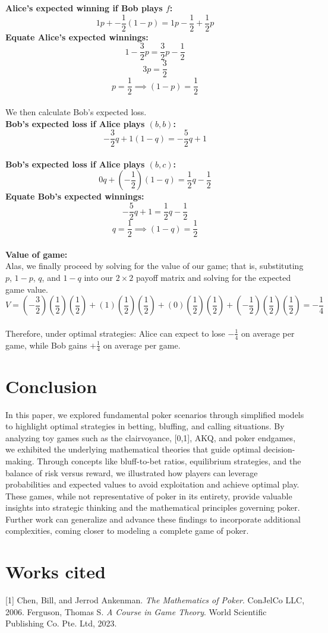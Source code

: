 \documentclass[12pt]{article}
\begin{document}
\textbf{Alice's expected winning if Bob plays $f$:}
\[
    1p + -\frac{1}{2}(1 - p) = 1p - \frac{1}{2} + \frac{1}{2}p
\]
\textbf{Equate Alice's expected winnings:}
\[
    1-\frac{3}{2}p = \frac{3}{2}p - \frac{1}{2}
\]
\[
    3p = \frac{3}{2}
\]
\[
    p = \frac{1}{2} \implies (1 - p) = \frac{1}{2}
\]
\\
We then calculate Bob's expected loss.
\\
\textbf{Bob's expected loss if Alice plays $(b, b)$:}
\[
    -\frac{3}{2}q + 1(1 - q) = -\frac{5}{2}q + 1
\]
\\
\textbf{Bob's expected loss if Alice plays $(b, c)$:}
\[
    0q + (-\frac{1}{2})(1 - q) = \frac{1}{2}q - \frac{1}{2}
\]
\textbf{Equate Bob's expected winnings:}
\[
    -\frac{5}{2}q + 1 = \frac{1}{2}q - \frac{1}{2}
\]
\[
    q = \frac{1}{2} \implies (1 - q) = \frac{1}{2}
\]
\\
\textbf{Value of game:} 
\\
Alas, we finally proceed by solving for the value of our game; that is, substituting $p$, $1 - p$, $q$, and $1 - q$ into our $2\times2$ payoff matrix and solving for the expected game value.
\[
    V = (-\frac{3}{2})(\frac{1}{2})(\frac{1}{2}) + (1)(\frac{1}{2})(\frac{1}{2}) + (0)(\frac{1}{2})(\frac{1}{2}) + (-\frac{1}{2})(\frac{1}{2})(\frac{1}{2}) = -\frac{1}{4}
\]
\\
Therefore, under optimal strategies: Alice can expect to lose $-\frac{1}{4}$ on average per game, while Bob gains $+\frac{1}{4}$ on average per game.

\section{Conclusion}

\hspace{\parindent} In this paper, we explored fundamental poker scenarios through simplified models to highlight optimal strategies in betting, bluffing, and calling situations. By analyzing toy games such as the clairvoyance, [0,1], AKQ, and poker endgames, we exhibited the underlying mathematical theories that guide optimal decision-making. Through concepts like bluff-to-bet ratios, equilibrium strategies, and the balance of risk versus reward, we illustrated how players can leverage probabilities and expected values to avoid exploitation and achieve optimal play. These games, while not representative of poker in its entirety, provide valuable insights into strategic thinking and the mathematical principles governing poker. Further work can generalize and advance these findings to incorporate additional complexities, coming closer to modeling a complete game of poker.

\section{Works cited}%

[1] Chen, Bill, and Jerrod Ankenman. \textit{The Mathematics of Poker}. ConJelCo LLC, 2006. 
\newline
[2] Ferguson, Thomas S. \textit{A Course in Game Theory}. World Scientific Publishing Co. Pte. Ltd, 2023. 
\end{document}
